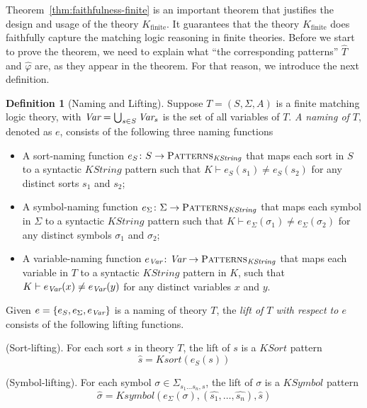 \documentclass[UTF8,11pt]{article}
\newcounter{thmcounter}
\theoremstyle{plain}
\theoremstyle{definition}
\newtheorem{definition} [thmcounter]{Definition}
\theoremstyle{remark}
\newcommand{\PATTERNS}{\text{P\textsc{atterns}}}
\newcommand{\Kfinite}{{K_\text{finite}}}
\newcommand{\KString}{\mathit{KString}}
\newcommand{\KSort}{\mathit{KSort}}
\newcommand{\Ksort}{\mathit{Ksort}}
\newcommand{\KSymbol}{\mathit{KSymbol}}
\newcommand{\Ksymbol}{\mathit{Ksymbol}}
\begin{document}
Theorem~\ref{thm:faithfulness-finite} is an important theorem that justifies the design and usage of the theory $\Kfinite$. 
It guarantees that the theory $\Kfinite$ does faithfully capture the matching logic reasoning in finite theories.
Before we start to prove the theorem, we need to explain what ``the corresponding patterns'' $\hat{T}$ and $\hat{\varphi}$ are, as they appear in the theorem.
For that reason, we introduce the next definition.

\begin{definition}[Naming and Lifting]
	Suppose $T = (S, \Sigma, A)$ is a finite matching logic theory, with $\textit{Var} = \bigcup_{s \in S} \textit{Var}_s$ is the set of all variables of $T$.
	\emph{A naming of $T$}, denoted as $e$, consists of the following three naming functions
	\begin{itemize}
		\item A sort-naming function $e_S \colon S \to \PATTERNS_\KString$ that maps each sort in $S$ to a syntactic $\KString$ pattern such that $K \vdash e_S(s_1) \neq e_S(s_2)$ for any distinct sorts $s_1$ and $s_2$;
		\item A symbol-naming function $e_\Sigma \colon \Sigma \to \PATTERNS_\KString$ that maps each symbol in $\Sigma$ to a syntactic $\KString$ pattern such that $K \vdash e_\Sigma(\sigma_1) \neq e_\Sigma(\sigma_2)$ for any distinct symbols $\sigma_1$ and $\sigma_2$;
		\item A variable-naming function $e_\Var \colon \Var \to \PATTERNS_\KString$ that maps each variable in $T$ to a syntactic $\KString$ pattern in $K$, such that $K \vdash e_{\textit{Var}}(x) \neq e_{\textit{Var}}(y)$ for any distinct variables $x$ and $y$.
	\end{itemize}

    Given $e = \{e_S, e_\Sigma, e_{\textit{Var}} \}$ is a naming of theory $T$, the \emph{lift of $T$ with respect to $e$} consists of the following lifting functions.
    
    (Sort-lifting).
    For each sort $s$ in theory $T$, the lift of $s$ is a $\KSort$ pattern
    $$ \hat{s} = \Ksort(e_S(s))$$
    
    (Symbol-lifting).
    For each symbol $\sigma \in \Sigma_{s_1 \dots s_n, s}$, the lift of $\sigma$ is a $\KSymbol$ pattern 
    $$ \hat{\sigma} = \Ksymbol(e_\Sigma(\sigma), (\hat{s_1}, \dots, \hat{s_n}), \hat{s})$$
    

\end{definition}
\end{document}
